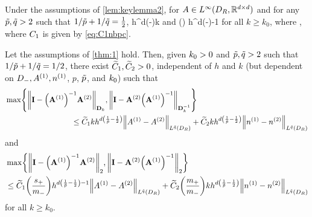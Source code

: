 \label{lem:keylemma2a}
Under the assumptions of \cref{lem:keylemma2}, for $A\in L^\infty(D_{R},\mathbb R^{d\times d})$ and for any $\tilde{p},\tilde{q} > 2$ such that $1/\tilde{p} + 1/\tilde{q} = \frac{1}{2}$,
\beq\label{eq:keybound22}
\max\set{\NDk{\AmatoI \SmatA},\NDkI{\SmatA\AmatoI}} \leq \Cotilde h^{d\mleft(-\half\mright)}k 
\eeq
and
\beq\label{eq:keybound2a2}
\max\set{\Nt{\AmatoI \SmatA},\Nt{\SmatA\AmatoI}} \leq \Cotilde\mleft(\frac{\splus}{\mminus}\mright) h^{d\mleft(-\half\mright)-1} 
\eeq
for all $k\geq k_0$, where
\beq\label{eq:C1tildenbpc}
\Cotilde \de \Cinvptilde\Co,
\eeq
where $C_{1}$ is given by \cref{eq:C1nbpc}.
\ele


\begin{theorem}\label{thm:1alt}
Let the assumptions of \cref{thm:1} hold.   Then, given $k_{0}>0$ and $\tilde{p},\tilde{q} >2$ such that $1/\tilde{p} + 1/\tilde{q} = 1/2$, there exist $\widetilde{C}_{1}, \widetilde{C}_{2}>0$, independent of $h$ and $k$ (but dependent on $D_{-}, {A}^{(1)}, {n}^{(1)}$, $p$, $\tilde{p}$, and $k_{0}$) such that
\begin{align}\nonumber
&\max\set{\NDk{\Imat - \AmatoI\Amatt},\NDkI{\Imat -\Amatt\AmatoI}}\\
&\hspace{3cm} 
\leq \Cotilde kh^{d\mleft(\frac1{\ptilde}-\half\mright)} \NLqtildeDR{\Aso-\Ast} + \Cttilde  kh^{d\mleft(\frac1{\ptilde}-\half\mright)}  \NLqtildeDR{\nso-\nst}
\label{eq:main1alt}
\end{align}
and 
\begin{align}\nonumber
&\max\set{\Nt{\Imat - \AmatoI\Amatt}, \Nt{\Imat -\Amatt\AmatoI}}\\
&\hspace{0cm}
\leq \Cotilde \mleft(\frac{\splus}{\mminus}\mright) h^{d\mleft(\frac1{\ptilde}-\half\mright)-1}\NLqtildeDR{\Aso-\Ast} + \Cttilde \mleft(\frac{\mplus}{\mminus}\mright) kh^{d\mleft(\frac1{\ptilde}-\half\mright)}\NLqtildeDR{\nso-\nst}
\label{eq:main1aalt}
\end{align}
for all $k\geq k_0$. 
\end{theorem}

